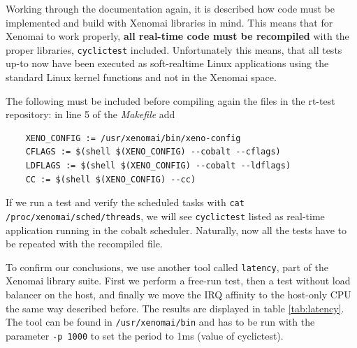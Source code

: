 \documentclass[]{scrartcl}
\begin{document}
Working through the documentation again, it is described how code must be implemented and build with Xenomai libraries in mind. 
This means that for Xenomai to work properly, \textbf{all real-time code must be recompiled} with the proper libraries, \texttt{cyclictest} included.
Unfortunately this means, that all tests up-to now have been executed as soft-realtime Linux applications using the standard Linux kernel functions and not in the Xenomai space.

The following must be included before compiling again the files in the rt-test repository: in line 5 of the \textit{Makefile} add

\begin{verbatim}
	XENO_CONFIG := /usr/xenomai/bin/xeno-config
	CFLAGS := $(shell $(XENO_CONFIG) --cobalt --cflags)
	LDFLAGS := $(shell $(XENO_CONFIG) --cobalt --ldflags)
	CC := $(shell $(XENO_CONFIG) --cc)
\end{verbatim}

If we run a test and verify the scheduled tasks with \texttt{cat /proc/xenomai/sched/threads}, we will see \texttt{cyclictest} listed as real-time application running in the cobalt scheduler.
Naturally, now all the tests have to be repeated with the recompiled file.


To confirm our conclusions, we use another tool called \texttt{latency}, part of the Xenomai library suite. First we perform a free-run test, then a test without load balancer on the host, and finally we move the IRQ affinity to the host-only CPU the same way described before. 
The results are displayed in table \ref{tab:latency}. The tool can be found in \texttt{/usr/xenomai/bin} and has to be run with the parameter \texttt{-p 1000} to set the period to 1ms (value of cyclictest).
\end{document}
